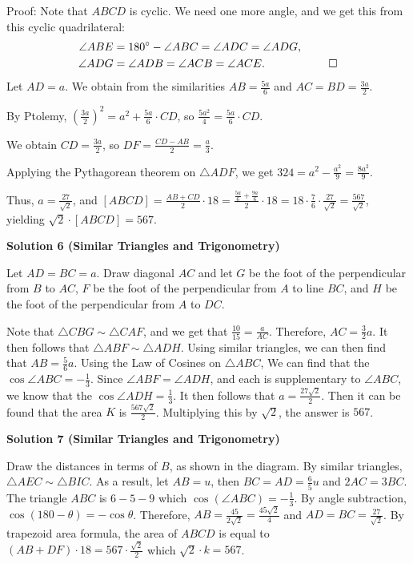\begin{enumerate}
 Proof: Note that $ABCD$ is cyclic. We need one more angle, and we get this from this cyclic quadrilateral: 
 \begin{align*} \angle ABE &= 180^\circ - \angle ABC =\angle ADC = \angle ADG, \\ \angle ADG &= \angle ADB =\angle ACB = \angle ACE. \hspace{20mm} \square \end{align*}
Let $AD=a$. We obtain from the similarities $AB = \frac{5a}{6}$ and $AC=BD=\frac{3a}{2}$.

 By Ptolemy, $\left(\frac{3a}{2}\right)^2 = a^2 + \frac{5a}{6} \cdot CD$, so $\frac{5a^2}{4} = \frac{5a}{6} \cdot CD$.

 We obtain $CD=\frac{3a}{2}$, so $DF=\frac{CD-AB}{2}=\frac{a}{3}$.

 Applying the Pythagorean theorem on $\triangle ADF$, we get $324=a^2 - \frac{a^2}{9}=\frac{8a^2}{9}$.

 Thus, $a=\frac{27}{\sqrt{2}}$, and $[ABCD]=\frac{AB+CD}{2} \cdot 18 = \frac{\frac{5a}{6} +\frac{9a}{6}}{2} \cdot 18 = 18 \cdot \frac{7}{6} \cdot \frac{27}{\sqrt{2}} = \frac{567}{\sqrt{2}}$, yielding $\sqrt2\cdot[ABCD]=\boxed{567}$.

 



\textbf{Solution 6 (Similar Triangles and Trigonometry)}

Let $AD=BC=a$. Draw diagonal $AC$ and let $G$ be the foot of the perpendicular from $B$ to $AC$, $F$ be the foot of the perpendicular from $A$ to line $BC$, and $H$ be the foot of the perpendicular from $A$ to $DC$.

 Note that $\triangle CBG\sim\triangle CAF$, and we get that $\frac{10}{15}=\frac{a}{AC}$. Therefore, $AC=\frac32 a$. It then follows that $\triangle ABF\sim\triangle ADH$. Using similar triangles, we can then find that $AB=\frac{5}{6}a$. Using the Law of Cosines on $\triangle ABC$, We can find that the $\cos\angle ABC=-\frac{1}{3}$. Since $\angle ABF=\angle ADH$, and each is supplementary to $\angle ABC$, we know that the $\cos\angle ADH=\frac{1}{3}$. It then follows that $a=\frac{27\sqrt{2}}{2}$. Then it can be found that the area $K$ is $\frac{567\sqrt{2}}{2}$. Multiplying this by $\sqrt{2}$, the answer is $\boxed{567}$.

 



\textbf{Solution 7 (Similar Triangles and Trigonometry)}

Draw the distances in terms of $B$, as shown in the diagram. By similar triangles, $\triangle{AEC}\sim\triangle{BIC}$. As a result, let $AB=u$, then $BC=AD=\frac{6}{5}u$ and $2AC=3BC$. The triangle $ABC$ is $6-5-9$ which $\cos(\angle{ABC})=-\frac{1}{3}$. By angle subtraction, $\cos(180-\theta)=-\cos\theta$. Therefore, $AB=\frac{45}{2\sqrt{2}}=\frac{45\sqrt{2}}{4}$ and $AD=BC=\frac{27}{\sqrt{2}}$. By trapezoid area formula, the area of $ABCD$ is equal to $(AB+DF)\cdot 18=567\cdot \frac{\sqrt{2}}{2}$ which $\sqrt{2}\cdot k=\boxed{567}$.


\end{enumerate}
